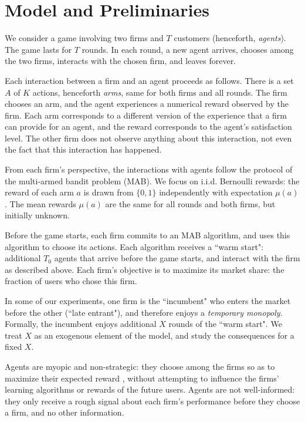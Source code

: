 \documentclass[../competing_bandits.tex]{subfiles}
\begin{document}
\section{Model and Preliminaries}\label{sec:model}

We consider a game involving two firms and $T$ customers (henceforth, \emph{agents}). The game lasts for $T$ rounds. In each round, a new agent arrives, chooses among the two firms, interacts with the chosen firm, and leaves forever.

Each interaction between a firm and an agent proceeds as follows. There is a set $A$ of $K$ actions, henceforth \emph{arms}, same for both firms and all rounds. The firm chooses an arm, and the agent experiences a numerical reward observed by the firm. Each arm corresponds to a different version of the experience that a firm can provide for an agent, and the reward corresponds to the agent's satisfaction level. The other firm does not observe anything about this interaction, not even the fact that this interaction has happened.

From each firm's perspective, the interactions with agents follow the protocol of the multi-armed bandit problem (MAB). We focus on i.i.d. Bernoulli rewards: the  reward of each arm $a$ is drawn from $\{0,1\}$ independently with expectation $\mu(a)$. The mean rewards $\mu(a)$ are the same for all rounds and both firms, but initially unknown.

Before the game starts, each firm commits to an MAB algorithm, and uses this algorithm to choose its actions. Each algorithm receives a ``warm start": additional $T_0$ agents that arrive before the game starts, and interact with the firm as described above.  Each firm's objective is to maximize its market share: the fraction of users who chose this firm.

In some of our experiments, one firm is the ``incumbent" who enters the market before the other (``late entrant"), and therefore enjoys a \emph{temporary monopoly}. Formally, the incumbent enjoys additional $X$ rounds of the ``warm start". We treat $X$ as an exogenous element of the model, and study the consequences for a fixed $X$.



 Agents are myopic and non-strategic: they choose among the firms so as to maximize their expected reward , without attempting to influence the firms' learning algorithms or rewards of the future users. Agents are not well-informed: they only receive a rough signal about each firm's performance before they choose a firm, and no other information.
\end{document}
